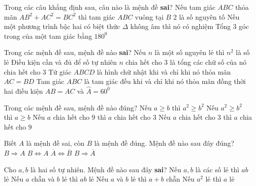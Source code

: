 \begin{ex}%
Trong các câu khẳng định sau, câu nào là mệnh đề \textbf{sai}?
\choice
{\True Nếu tam giác $ABC$ thỏa mãn $AB^2+AC^2=BC^2$ thì tam giác $ABC$ vuông tại $B$}
{2 là số nguyên tố}
{Nếu một phương trình bậc hai có biệt thức $\Delta$ không âm thì nó có nghiệm}
{Tổng $3$ góc trong của một tam giác bằng $180^0$} 
\end{ex}
\begin{ex}%
Trong các mệnh đề sau, mệnh đề nào \textbf{sai}?
\choice
{Nếu $n$ là một số nguyên lẻ thì $n^2$ là số lẻ}
{Điều kiện cần và đủ để số tự nhiên $n$ chia hết cho 3 là tổng các chữ số của nó chia hết cho $3$}
{\True Tứ giác $ABCD$ là hình chữ nhật khi và chỉ khi nó thỏa mãn $AC=BD$}
{Tam giác $ABC$ là tam giác đều khi và chỉ khi nó thỏa mãn đồng thời hai điều kiện $AB=AC$ và $\widehat{A}=60^0$} 
\end{ex}

\begin{ex}%
Trong các mệnh đề sau, mệnh đề nào đúng?
\choice
{Nếu $a\ge b$ thì $a^2\ge b^2$}
{Nếu $a^2 \ge b^2$ thì $a \ge b$}
{\True Nếu $a$ chia hết cho $9$ thì $a$ chia hết cho $3$}
{Nếu $a$ chia hết cho 3 thì $a$ chia hết cho $9$}
\end{ex}


\begin{ex}%
Biết $A$ là mệnh đề sai, còn $B$ là mệnh đề đúng. Mệnh đề nào sau đây đúng?
\choice 
{ $B\Rightarrow A$}
{ $B\Leftrightarrow A$ }
{ $\overline{A}\Leftrightarrow \overline{B}$ }
{ \True $B\Rightarrow \overline{A}$} 
\end{ex} 
\begin{ex}%
Cho $a,b$ là hai số tự  nhiên. Mệnh đề nào sau đây \textbf{sai}?
\choice
{Nếu $a, b$ là các số lẻ thì $ab$ lẻ}
{\True Nếu $a$ chẵn và $b$ lẻ thì $ab$ lẻ}
{Nếu $a$ và $b$ lẻ thì $a+b$ chẵn}
{Nếu $a^2$ lẻ thì $a$ lẻ} 
\end{ex}

